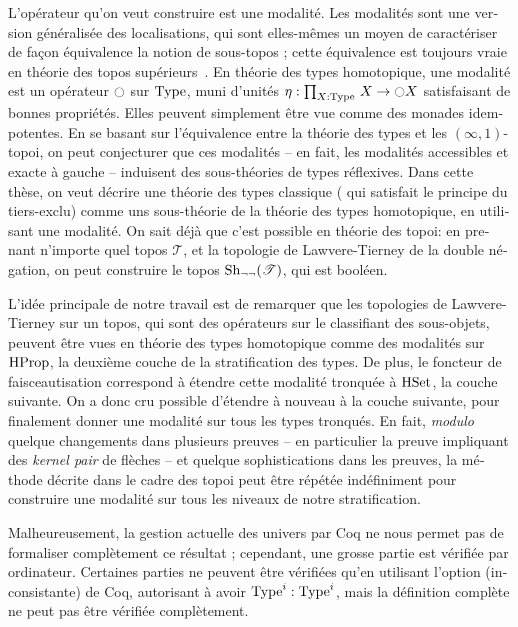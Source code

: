 \begin{otherlanguage}{french}
L'opérateur qu'on veut construire est une modalité. Les modalités sont
une version généralisée des localisations, qui sont elles-mêmes un
moyen de caractériser de façon équivalence la notion de sous-topos ;
cette équivalence est toujours vraie en théorie des topos
supérieurs~\cite[Section 6.2.2]{lurie}. En théorie des types
homotopique, une modalité est un opérateur $\ocircle$ sur $\operatorname{Type}$, muni
d'unités $\eta:\prod_{X:\operatorname{Type}}\, X\to\ocircle X$ satisfaisant de bonnes
propriétés. Elles peuvent simplement être vue comme des monades
idempotentes. En se basant sur l'équivalence entre la théorie des
types et les $(\infty,1)$-topoi, on peut conjecturer que ces modalités
-- en fait, les modalités accessibles et exacte à gauche -- induisent
des sous-théories de types réflexives. Dans cette thèse, on veut
décrire une théorie des types classique (\ie{} qui satisfait le
principe du tiers-exclu) comme uns sous-théorie de la théorie des
types homotopique, en utilisant une modalité. On sait déjà que c'est
possible en théorie des topoi: en prenant n'importe quel topos
$\mathcal T$, et la topologie de Lawvere-Tierney de la double
négation, on peut construire le topos $\mathrm{Sh}_{\lnot\lnot}(\mathcal T)$,
qui est booléen.

L'idée principale de notre travail est de remarquer que les topologies
de Lawvere-Tierney sur un topos, qui sont des opérateurs sur le
classifiant des sous-objets, peuvent être vues en théorie des types
homotopique comme des modalités sur $\operatorname{HProp}$, la deuxième couche de la
stratification des types. De plus, le foncteur de faisceautisation
correspond à étendre cette modalité tronquée à $\operatorname{HSet}$, la couche
suivante. On a donc cru possible d'étendre à nouveau à la couche
suivante, \etc{} pour finalement donner une modalité sur tous les
types tronqués. En fait, {\em modulo} quelque changements dans
plusieurs preuves -- en particulier la preuve impliquant des {\em
  kernel pair} de flèches -- et quelque sophistications dans les
preuves, la méthode décrite dans le cadre des topoi peut être répétée
indéfiniment pour construire une modalité sur tous les niveaux de
notre stratification.

Malheureusement, la gestion actuelle des univers par Coq ne nous
permet pas de formaliser complètement ce résultat ; cependant, une
grosse partie est vérifiée par ordinateur. Certaines parties ne
peuvent être vérifiées qu'en utilisant l'option (inconsistante)
 de Coq, autorisant à avoir $\operatorname{Type}^i : \operatorname{Type}^i$,
mais la définition complète ne peut pas être vérifiée complètement. 

\end{otherlanguage}


